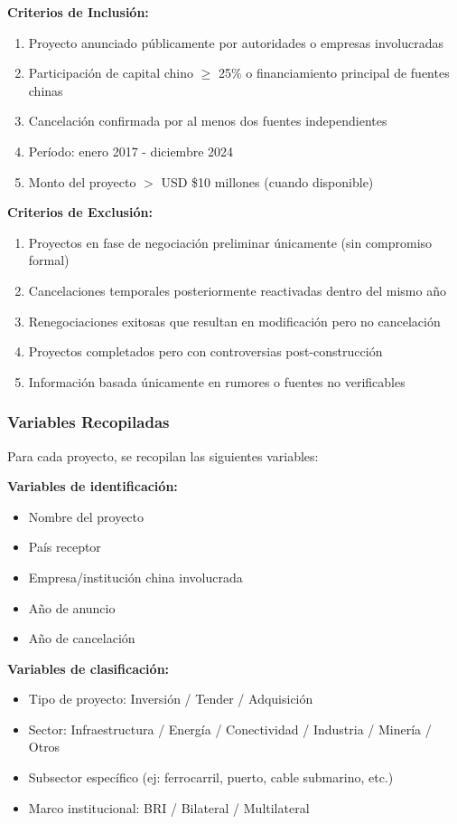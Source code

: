 \documentclass[12pt]{article}
\begin{document}
\textbf{Criterios de Inclusión:}
\begin{enumerate}
    \item Proyecto anunciado públicamente por autoridades o empresas involucradas
    \item Participación de capital chino $\geq$ 25\% o financiamiento principal de fuentes chinas
    \item Cancelación confirmada por al menos dos fuentes independientes
    \item Período: enero 2017 - diciembre 2024
    \item Monto del proyecto $>$ USD \$10 millones (cuando disponible)
\end{enumerate}

\textbf{Criterios de Exclusión:}
\begin{enumerate}
    \item Proyectos en fase de negociación preliminar únicamente (sin compromiso formal)
    \item Cancelaciones temporales posteriormente reactivadas dentro del mismo año
    \item Renegociaciones exitosas que resultan en modificación pero no cancelación
    \item Proyectos completados pero con controversias post-construcción
    \item Información basada únicamente en rumores o fuentes no verificables
\end{enumerate}

\subsubsection{Variables Recopiladas}

Para cada proyecto, se recopilan las siguientes variables:

\textbf{Variables de identificación:}
\begin{itemize}
    \item Nombre del proyecto
    \item País receptor
    \item Empresa/institución china involucrada
    \item Año de anuncio
    \item Año de cancelación
\end{itemize}

\textbf{Variables de clasificación:}
\begin{itemize}
    \item Tipo de proyecto: Inversión / Tender / Adquisición
    \item Sector: Infraestructura / Energía / Conectividad / Industria / Minería / Otros
    \item Subsector específico (ej: ferrocarril, puerto, cable submarino, etc.)
    \item Marco institucional: BRI / Bilateral / Multilateral
\end{itemize}
\end{document}
